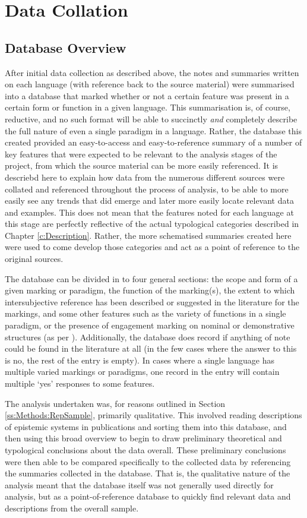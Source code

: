 \section{Data Collation}\label{s:Methods:Schema}
\subsection{Database Overview}
After initial data collection as described above, the notes and summaries written on each language (with reference back to the source material) were summarised into a database that marked whether or not a certain feature was present in a certain form or function in a given language. This summarisation is, of course, reductive, and no such format will be able to succinctly \textit{and} completely describe the full nature of even a single paradigm in a language. Rather, the database this created provided an easy-to-access and easy-to-reference summary of a number of key features that were expected to be relevant to the analysis stages of the project, from which the source material can be more easily referenced. It is descriebd here to explain how data from the numerous different sources were collated and referenced throughout the process of analysis, to be able to more easily see any trends that did emerge and later more easily locate relevant data and examples. This does not mean that the features noted for each language at this stage are perfectly reflective of the actual typological categories described in Chapter \ref{c:Description}. Rather, the more schematised summaries created here were used to come develop those categories and act as a point of reference to the original sources.

The database can be divided in to four general sections: the scope and form of a given marking or paradigm, the function of the marking(s), the extent to which intersubjective reference has been described or suggested in the literature for the markings, and some other features such as the variety of functions in a single paradigm, or the presence of engagement marking on nominal or demonstrative structures (as per ). Additionally, the database does record if anything of note could be found in the literature at all (in the few cases where the answer to this is no, the rest of the entry is empty). In cases where a single language has multiple varied markings or paradigms, one record in the entry will contain multiple `yes' responses to some features.

The analysis undertaken was, for reasons outlined in Section \ref{ss:Methods:RepSample}, primarily qualitative. This involved reading descriptions of epistemic systems in publications and sorting them into this database, and then using this broad overview to begin to draw preliminary theoretical and typological conclusions about the data overall. These preliminary conclusions were then able to be compared specifically to the collected data by referencing the summaries collected in the database. That is, the qualitative nature of the analysis meant that the database itself was not generally used directly for analysis, but as a point-of-reference database to quickly find relevant data and descriptions from the overall sample.

